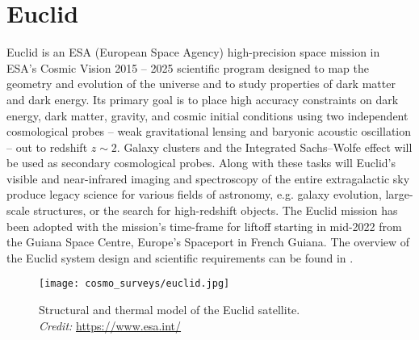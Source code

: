 \section{Euclid}
Euclid is an ESA (European Space Agency) high-precision space mission in ESA's Cosmic Vision 2015 -- 2025 scientific program designed to map the geometry and evolution of the universe and to study properties of dark matter and dark energy. Its primary goal is to place high accuracy constraints on dark energy, dark matter, gravity, and cosmic initial conditions using two independent cosmological probes -- weak gravitational lensing and baryonic acoustic oscillation -- out to redshift $z\sim2$. Galaxy clusters and the Integrated Sachs--Wolfe effect will be used as secondary cosmological probes. Along with these tasks will Euclid's visible and near-infrared imaging and spectroscopy of the entire extragalactic sky produce legacy science for various fields of astronomy, e.g. galaxy evolution, large-scale structures, or the search for high-redshift objects. The Euclid mission has been adopted with the mission's time-frame for liftoff starting in mid-2022 from the Guiana Space Centre, Europe's Spaceport in French Guiana. The overview of the Euclid system design and scientific requirements can be found in \cite{2011arXiv1110.3193L}.
\begin{figure}[htb]
    \centering
    \texttt{[image: cosmo\_surveys/euclid.jpg]}
    \caption{Structural and thermal model of the Euclid satellite.\\\textit{Credit:} \url{https://www.esa.int/}}
    \label{fig:euclid}
\end{figure}
\clearpage
